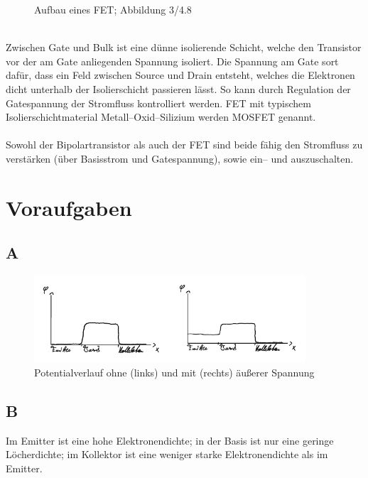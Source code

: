 \documentclass[a4paper,10pt]{article}
\numberwithin{equation}{section}
\begin{document}
\begin{multicols}{2}
\begin{figure}[h]
        \caption{Aufbau eines FET; Abbildung 3/4.8 \cite{Praktikumsanleitung}}
\end{figure}\\
Zwischen Gate und Bulk ist eine dünne isolierende Schicht, welche den Transistor vor der am Gate anliegenden Spannung isoliert.
Die Spannung am Gate sort dafür, dass ein Feld zwischen Source und Drain entsteht, welches die Elektronen dicht unterhalb der Isolierschicht passieren lässt.
So kann durch Regulation der Gatespannung der Stromfluss kontrolliert werden.
FET mit typischem Isolierschichtmaterial Metall--Oxid--Silizium werden MOSFET genannt.
\\\\ Sowohl der Bipolartransistor als auch der FET sind beide fähig den Stromfluss zu verstärken (über Basisstrom und Gatespannung), sowie ein-- und auszuschalten.


\clearpage
\section{Voraufgaben}
\subsection{A}
\begin{figure}[h]
        \centering
        \includegraphics[width=0.9\textwidth]{A_crop.pdf}
        \caption[Potentialverlauf ohne und mit äußerer Spannung]{Potentialverlauf ohne (links) und mit (rechts) äußerer Spannung}
\end{figure}

\subsection{B}
Im Emitter ist eine hohe Elektronendichte; in der Basis ist nur eine geringe Löcherdichte; im Kollektor ist eine weniger starke Elektronendichte als im Emitter.


\end{multicols}
\end{document}

